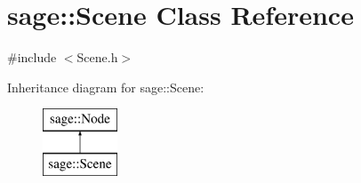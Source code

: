 \hypertarget{classsage_1_1Scene}{}\section{sage\+::Scene Class Reference}
\label{classsage_1_1Scene}


{\ttfamily \#include $<$Scene.\+h$>$}

Inheritance diagram for sage\+::Scene\+:\begin{figure}[H]
\begin{center}
\leavevmode
\includegraphics[height=2.000000cm]{classsage_1_1Scene}
\end{center}
\end{figure}
